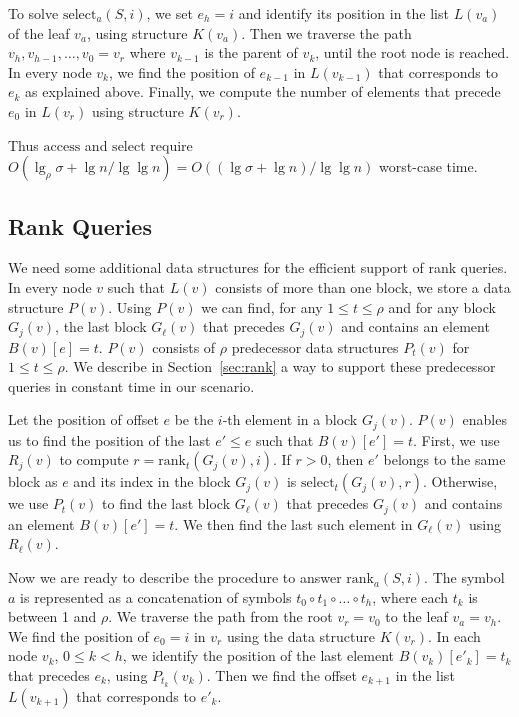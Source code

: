 \documentclass[11pt]{article}
\def\idrm#1{\ensuremath{\mathrm{#1}}}
\newcommand{\cP}{{ K}}
\newcommand{\ra}{\idrm{rank}}
\newcommand{\sel}{\idrm{select}}
\newcommand{\acc}{\idrm{access}}
\begin{document}
To solve $\sel_a(S,i)$, we set $e_h=i$ and identify its position in the 
list $L(v_a)$ of the leaf $v_a$, using structure $\cP(v_a)$. 
Then we traverse the path 
$v_h,v_{h-1},\ldots,v_0=v_r$ where $v_{k-1}$ is the parent of $v_k$, until 
the root node is reached. In every node $v_k$, we find the position of
$e_{k-1}$ in $L(v_{k-1})$ that corresponds to $e_k$ as explained above. 
Finally, we compute 
the number of elements that precede $e_0$ in $L(v_r)$ using 
structure $\cP(v_r)$.  

Thus $\acc$ and $\sel$ require $O(\lg_\rho\sigma+\lg n /\lg\lg n) = 
O((\lg\sigma+\lg n)/\lg\lg n)$
worst-case time.


\subsection{Rank Queries}

We need some additional data structures for the efficient support of rank queries. 
In every node $v$ such that $L(v)$ consists of more than one block, we store a data structure $P(v)$. Using 
$P(v)$ we can find, for any $1\le t \le \rho$ and for any block 
$G_j(v)$, the last block $G_\ell(v)$  that precedes $G_j(v)$ and contains 
an element $B(v)[e]=t$. 
$P(v)$ consists of $\rho$ predecessor data structures $P_t(v)$ for 
$1\le t\le \rho$. 
We describe in 
Section~\ref{sec:rank} a way to support these predecessor queries in constant 
time in our scenario.

Let the position of offset $e$ be the $i$-th element in a block $G_j(v)$. 
$P(v)$ enables us to find the position of the last $e'\le e$ such that
$B(v)[e']=t$. First, we use $R_j(v)$ to compute
$r=\ra_t(G_j(v),i)$. If  $r>0$, then $e'$ belongs to the same 
block as $e$ and its index in the block $G_j(v)$ is
$\sel_t(G_j(v),r)$. Otherwise, we use $P_t(v)$ to find the 
last block $G_\ell(v)$ that precedes $G_j(v)$ and contains an  element 
$B(v)[e']=t$. We then find the last such element in 
$G_\ell(v)$ using $R_\ell(v)$.

Now we are ready to describe the procedure to answer $\ra_a(S,i)$. The symbol 
$a$ is represented as a concatenation of symbols 
$t_0\circ t_1\circ\ldots\circ t_h$, where each $t_k$ is between 1 and $\rho$. 
We traverse the path from the root $v_r=v_0$ to the leaf $v_a=v_h$.  
We find the position of $e_0=i$ in $v_r$ using 
the data structure $\cP(v_r)$. In each node $v_k$, $0\le k< h$, 
 we identify the position of the last element $B(v_k)[e'_k]=t_k$ that precedes 
$e_k$, using $P_{t_k}(v_k)$. 
Then we find the offset $e_{k+1}$ in the list $L(v_{k+1})$ that 
corresponds to $e'_{k}$.
\end{document}

